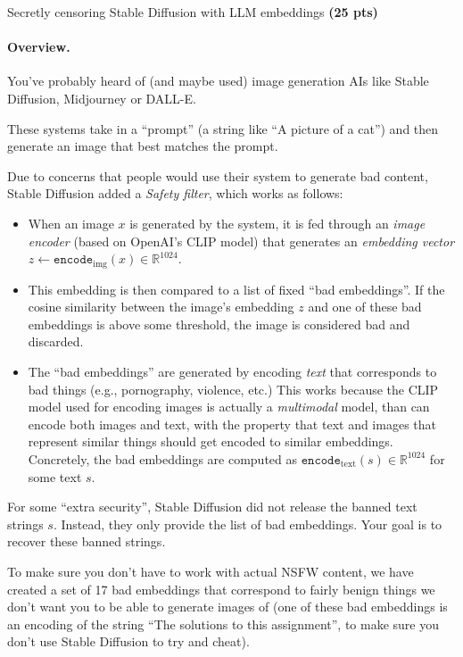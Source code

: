 \begin{question}{
Secretly censoring Stable Diffusion with LLM embeddings \textbf{(25 pts)}}

\paragraph{Overview.}
You've probably heard of (and maybe used) image generation AIs like Stable Diffusion, Midjourney or DALL-E.

These systems take in a ``prompt'' (a string like ``A picture of a cat'') and then generate an image that best matches the prompt.

Due to concerns that people would use their system to generate bad content, Stable Diffusion added a \emph{Safety filter}, which works as follows:

\begin{itemize}
    \item When an image $x$ is generated by the system, it is fed through an \emph{image encoder} (based on OpenAI's CLIP model) that generates an \emph{embedding vector} $z \gets \texttt{encode}_{\textrm{img}}(x) \in \mathbb{R}^{1024}$.

    \item This embedding is then compared to a list of fixed ``bad embeddings''.
    If the cosine similarity between the image's embedding $z$ and one of these bad embeddings is above some threshold, the image is considered bad and discarded.

    \item The ``bad embeddings'' are generated by encoding \emph{text} that corresponds to bad things (e.g., pornography, violence, etc.)
    This works because the CLIP model used for encoding images is actually a \emph{multimodal} model, than can encode both images and text, with the property that text and images that represent similar things should get encoded to similar embeddings.
    Concretely, the bad embeddings are computed as $\texttt{encode}_{\textrm{text}}(s) \in \mathbb{R}^{1024}$ for some text $s$.
\end{itemize}

For some ``extra security'', Stable Diffusion did not release the banned text strings $s$. Instead, they only provide the list of bad embeddings.
Your goal is to recover these banned strings.

To make sure you don't have to work with actual NSFW content, we have created a set of 17 bad embeddings that correspond to fairly benign things we don't want you to be able to generate images of (one of these bad embeddings is an encoding of the string ``The solutions to this assignment'', to make sure you don't use Stable Diffusion to try and cheat).


\end{question}
